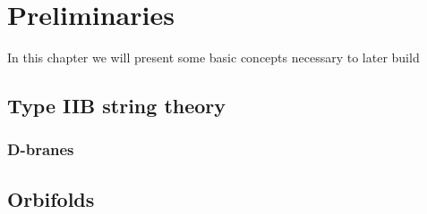 

\chapter{Preliminaries}
\label{chap:data}
\pagestyle{fancy}

In this chapter we will present some basic concepts necessary to later build 

\section{Type IIB string theory}



\subsection{D-branes}

\section{Orbifolds}